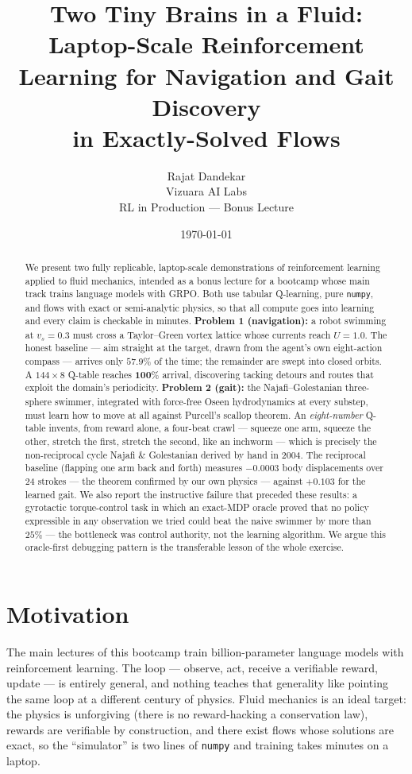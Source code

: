\documentclass[11pt]{article}
\title{\textbf{Two Tiny Brains in a Fluid:\\ Laptop-Scale Reinforcement Learning for
Navigation and Gait Discovery\\ in Exactly-Solved Flows}}
\author{Rajat Dandekar\\ \small Vizuara AI Labs\\
\small RL in Production --- Bonus Lecture}
\date{\today}
\begin{document}
\maketitle

\begin{abstract}
\noindent
We present two fully replicable, laptop-scale demonstrations of reinforcement learning
applied to fluid mechanics, intended as a bonus lecture for a bootcamp whose main track
trains language models with GRPO. Both use tabular Q-learning, pure \texttt{numpy}, and
flows with exact or semi-analytic physics, so that all compute goes into learning and
every claim is checkable in minutes. \textbf{Problem 1 (navigation):} a robot swimming at
$v_s = 0.3$ must cross a Taylor--Green vortex lattice whose currents reach $U = 1.0$.
The honest baseline --- aim straight at the target, drawn from the agent's own eight-action
compass --- arrives only $57.9\%$ of the time; the remainder are swept into closed orbits.
A $144\times 8$ Q-table reaches $\mathbf{100\%}$ arrival, discovering tacking detours and
routes that exploit the domain's periodicity. \textbf{Problem 2 (gait):} the
Najafi--Golestanian three-sphere swimmer, integrated with force-free Oseen hydrodynamics
at every substep, must learn how to move at all against Purcell's scallop theorem. An
\emph{eight-number} Q-table invents, from reward alone, a four-beat crawl --- squeeze one
arm, squeeze the other, stretch the first, stretch the second, like an inchworm --- which is
precisely the non-reciprocal cycle Najafi \& Golestanian derived by hand in 2004. The
reciprocal baseline (flapping one arm back and forth) measures $-0.0003$ body displacements
over 24 strokes --- the theorem confirmed by
our own physics --- against $+0.103$ for the learned gait. We also report the instructive
failure that preceded these results: a gyrotactic torque-control task in which an
exact-MDP oracle proved that no policy expressible in any observation we tried could beat
the naive swimmer by more than $25\%$ --- the bottleneck was control authority, not the
learning algorithm. We argue this oracle-first debugging pattern is the transferable
lesson of the whole exercise.
\end{abstract}

\section{Motivation}

The main lectures of this bootcamp train billion-parameter language models with
reinforcement learning. The loop --- observe, act, receive a verifiable reward, update ---
is entirely general, and nothing teaches that generality like pointing the same loop at
a different century of physics. Fluid mechanics is an ideal target: the physics is
unforgiving (there is no reward-hacking a conservation law), rewards are verifiable by
construction, and there exist flows whose solutions are exact, so the ``simulator'' is
two lines of \texttt{numpy} and training takes minutes on a laptop.
\end{document}
